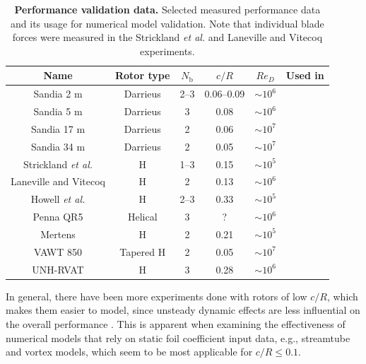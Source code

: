 \documentclass[10pt,letterpaper]{article}
\begin{document}
\begin{table}
    \centering
    
    \begin{tabular}{c|c|c|c|c|c}
        Name & Rotor type & $N_\mathrm{b}$ & $c/R$ & $Re_D$ & Used in \\ 
        \hline
        Sandia 2 m \cite{Blackwell1976} &  Darrieus  & 2--3 & 0.06--0.09 & $\sim 10^6$ & \cite{Roh2013} \\ 
        Sandia 5 m \cite{Sheldahl1977} &  Darrieus  & 3 & 0.08 & $\sim 10^6$ & \cite{Antheaume2008} \\ 
        Sandia 17 m \cite{Worstell1978} & Darrieus  & 2 & 0.06 & $\sim 10^7$ & \cite{Para1988,Orlandi2015} \\ 
        Sandia 34 m \cite{Ashwill1992} & Darrieus  & 2 & 0.05 & $\sim 10^7$ & \cite{Liu1992,Murray2011}  \\ 
        Strickland \emph{et al.} \cite{Strickland1981} & H & 1--3 & 0.15 & $\sim 10^5$ & \cite{Ponta2001,Scheurich2011b} \\ 
        Laneville and Vitecoq \cite{Laneville1986} & H & 2 & 0.13 & $\sim 10^6$ & \cite{Amet2009} \\ 
        Howell \emph{et al.} \cite{Howell2010} & H & 2--3 & 0.33 & $\sim 10^5$ & \cite{Joo2015} \\ 
        Penna QR5 \cite{Penna2008} & Helical & 3 & ? & $\sim 10^6$ & \cite{Scheurich2011} \\ 
        Mertens \cite{Mertens2003} & H & 2 & 0.21 & $\sim 10^5$ & \cite{Orlandi2015} \\ 
        VAWT 850 \cite{Mays1990} & Tapered H & 2 & 0.05 & $\sim 10^7$ & \cite{Murray2011} \\ 
        UNH-RVAT \cite{Bachant2014-RVAT-baseline} & H & 3 & 0.28 & $\sim 10^6$ & \cite{Michelen2014}
    \end{tabular}     

    \caption{\textbf{Performance validation data.} Selected measured performance
        data and its usage for numerical model validation. Note that individual
        blade forces were measured in the Strickland \emph{et al.} and Laneville and
        Vitecoq experiments.}

    \label{tab:validation-data}
\end{table}

In general, there have been more experiments done with rotors of low $c/R$,
which makes them easier to model, since unsteady dynamic effects are less
influential on the overall performance \cite{Strickland1981}. This is apparent
when examining the effectiveness of numerical models that rely on static foil
coefficient input data, e.g., streamtube and vortex models, which seem to be
most applicable for $c/R \leq 0.1$.
\end{document}
